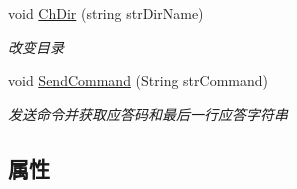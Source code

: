 \begin{DoxyCompactItemize}
void \hyperlink{class_x_c_l_net_tools_1_1_f_t_p_1_1_f_t_p_client_a6345c0af7cd414503395170157d0db3b}{Ch\+Dir} (string str\+Dir\+Name)
\begin{DoxyCompactList}\small\item\em 改变目录 \end{DoxyCompactList}\item 
void \hyperlink{class_x_c_l_net_tools_1_1_f_t_p_1_1_f_t_p_client_af99f1f4bd038882ec30bdf4e89d73d4a}{Send\+Command} (String str\+Command)
\begin{DoxyCompactList}\small\item\em 发送命令并获取应答码和最后一行应答字符串 \end{DoxyCompactList}\end{DoxyCompactItemize}
\subsection*{属性}
